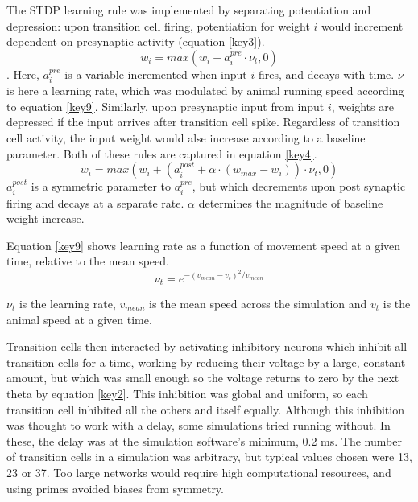 \documentclass{article}
\begin{document}
    The STDP learning rule was implemented by separating potentiation and depression: upon transition cell firing, potentiation for weight \(i\) would increment dependent on presynaptic activity (equation \ref{key3}).  
    \begin{equation} \label{key3} w_i = max(w_i + a^{pre}_i \cdot \nu_t, 0)\end{equation}. 
    Here, \(a^{pre}_i\) is a variable incremented when input \(i\) fires, and decays with time. \(\nu\) is here a learning rate, which was modulated by animal running speed according to equation \ref{key9}.
    Similarly, upon presynaptic input from input \(i\), weights are depressed if the input arrives after transition cell spike. Regardless of transition cell activity, the input weight would alse increase according to a baseline parameter. Both of these rules are captured in equation \ref{key4}. 
    \begin{equation} \label{key4} w_i = max(w_i + (a^{post}_i + \alpha \cdot (w_{max}-w_i)) \cdot \nu_t, 0)\end{equation} 
    \(a^{post}_i\) is a symmetric parameter to \(a^{pre}_i\), but which decrements upon post synaptic firing and decays at a separate rate. \(\alpha\) determines the magnitude of baseline weight increase.

    Equation \ref{key9} shows learning rate as a function of movement speed at a given time, relative to the mean speed.
    \begin{equation} 
        \label{key9}
        \nu_t = e ^ {-(v_{mean} - v_t)^2/v_{mean}}
    \end{equation}

    \(\nu_t\) is the learning rate, \(v_{mean}\) is the mean speed across the simulation and \(v_t\) is the animal speed at a given time.

    Transition cells then interacted by activating inhibitory neurons which inhibit all transition cells for a time, working by reducing their voltage by a large, constant amount, but which was small enough so the voltage returns to zero by the next theta by equation \ref{key2}. This inhibition was global and uniform, so each transition cell inhibited all the others and itself equally. Although this inhibition was thought to work with a delay, some simulations tried running without. In these, the delay was at the simulation software's minimum, 0.2 ms. The number of transition cells in a simulation was arbitrary, but typical values chosen were 13, 23 or 37. Too large networks would require high computational resources, and using primes avoided biases from symmetry.
\end{document}
